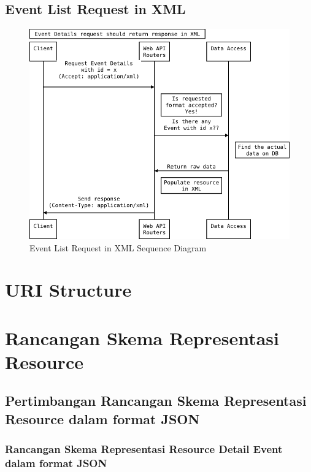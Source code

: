 \documentclass[a4paper, 12pt, oneside]{report}
\begin{document}
\newpage

\subsection{Event List Request in XML}

\begin{figure}[htp]
\centering
\includegraphics[scale=0.60]{images/event-details-request-seq-diagram-xml.png}
\caption{Event List Request in XML Sequence Diagram}
\label{event-list-request-seq-diagram-xml}
\end{figure}

\section{URI Structure}

\section{Rancangan Skema Representasi Resource}

\subsection{Pertimbangan Rancangan Skema Representasi Resource dalam format JSON}

\subsubsection{Rancangan Skema Representasi Resource Detail Event dalam format JSON}
\end{document}
